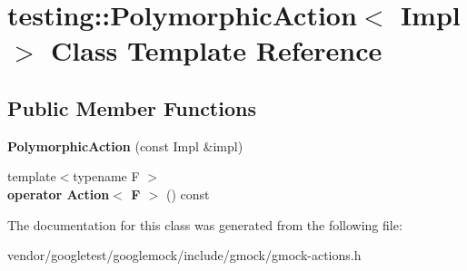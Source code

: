 \hypertarget{classtesting_1_1PolymorphicAction}{}\section{testing\+:\+:Polymorphic\+Action$<$ Impl $>$ Class Template Reference}
\label{classtesting_1_1PolymorphicAction}
\subsection*{Public Member Functions}
\begin{DoxyCompactItemize}
\item 
{\bfseries Polymorphic\+Action} (const Impl \&impl)\hypertarget{classtesting_1_1PolymorphicAction_a062e5a45ad61dcf8085b15cc882ca0ae}{}\label{classtesting_1_1PolymorphicAction_a062e5a45ad61dcf8085b15cc882ca0ae}

\item 
{\footnotesize template$<$typename F $>$ }\\{\bfseries operator Action$<$ F $>$} () const \hypertarget{classtesting_1_1PolymorphicAction_a40a074d559aceae2afcf53a305cfdcb5}{}\label{classtesting_1_1PolymorphicAction_a40a074d559aceae2afcf53a305cfdcb5}

\end{DoxyCompactItemize}


The documentation for this class was generated from the following file\+:\begin{DoxyCompactItemize}
\item 
vendor/googletest/googlemock/include/gmock/gmock-\/actions.\+h\end{DoxyCompactItemize}
